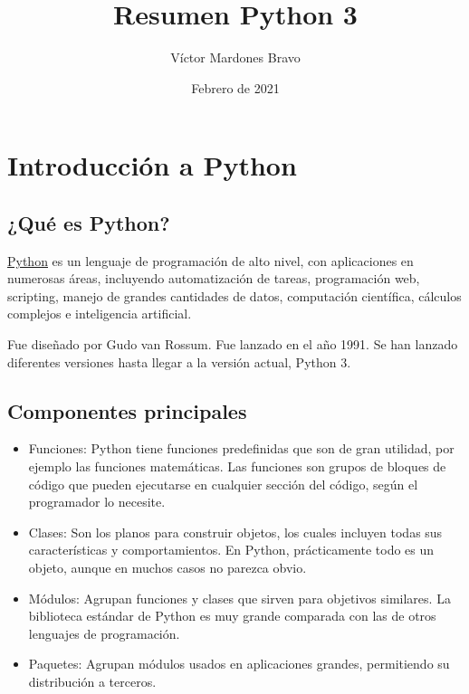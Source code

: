 \documentclass{report}
\title{Resumen Python 3}
\author{Víctor Mardones Bravo}
\date{Febrero de 2021}
\newcommand{\link}[2]{\href{#1}{\underline{#2}}}
\begin{document}

\null
\nointerlineskip
\vfill
\let\snewpage \newpage
\let\newpage \relax
  {\centering\def\svgwidth{\columnwidth}
  }
\maketitle
\let \newpage \snewpage
\vfill 
\break

\clearpage

\tableofcontents

\clearpage


\chapter{Introducción a Python}

\section{¿Qué es Python?}

\link{https://www.python.org}{Python} es un lenguaje de programación de alto nivel, con aplicaciones en numerosas áreas, incluyendo automatización de tareas, programación web, scripting, manejo de grandes cantidades de datos, computación científica, cálculos complejos e inteligencia artificial.\smallskip

Fue diseñado por Gudo van Rossum. Fue lanzado en el año 1991. Se han lanzado diferentes versiones hasta llegar a la versión actual, Python 3.

\section{Componentes principales}

\begin{itemize}
  \item Funciones: Python tiene funciones predefinidas que son de gran utilidad, por ejemplo las funciones matemáticas. Las funciones son grupos de bloques de código que pueden ejecutarse en cualquier sección del código, según el programador lo necesite.
  
  \item Clases: Son los planos para construir objetos, los cuales incluyen todas sus características y comportamientos. En Python, prácticamente todo es un objeto, aunque en muchos casos no parezca obvio.
  
  \item Módulos: Agrupan funciones y clases que sirven para objetivos similares. La biblioteca estándar de Python es muy grande comparada con las de otros lenguajes de programación.
  
  \item Paquetes: Agrupan módulos usados en aplicaciones grandes, permitiendo su distribución a terceros.
  
\end{itemize}
\end{document}

